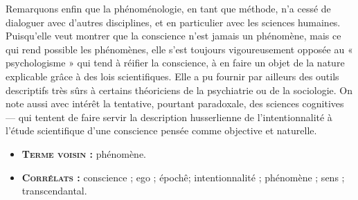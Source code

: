 Remarquons enfin que la phénoménologie,
en tant que méthode, n’a cessé de
dialoguer avec d’autres disciplines, et en
particulier avec les sciences humaines.
Puisqu’elle veut montrer que la
conscience n’est jamais un phénomène,
mais ce qui rend possible les phénomènes,
elle s’est toujours vigoureusement
opposée au « psychologisme » qui
tend à réifier la conscience, à en faire un
%
objet de la nature explicable grâce à des
lois scientifiques. Elle a pu fournir par
ailleurs des outils descriptifs très sûrs à
certains théoriciens de la psychiatrie ou
de la sociologie. On note aussi avec
intérêt la tentative, pourtant paradoxale,
des sciences cognitives — qui tentent
de faire servir la description husserlienne
de l'intentionnalité à l'étude
scientifique d’une conscience pensée
comme objective et naturelle.

\begin{itemize}[leftmargin=1cm, label=, itemsep=1pt]
\item {\bf \textsc{Terme voisin} :} phénomène.
\item {\bf \textsc{Corrélats} :} conscience ; ego ;
épochê;  intentionnalité ;  phénomène ;
sens ; transcendantal.
\end{itemize}

